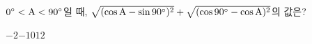 $0^\circ<\mathrm{A}<90^\circ$일 때, $\sqrt{(\cos\mathrm{A}-\sin 90^\circ)^2}+\sqrt{(\cos 90^\circ-\cos\mathrm{A})^2}$의 값은?
\begin{choices32}{$-2$}{$-1$}{$0$}{$1$}{$2$}\end{choices32}
